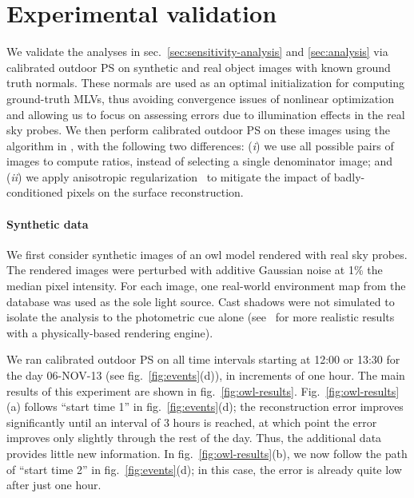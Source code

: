 \section{Experimental validation}

We validate the analyses in sec.~\ref{sec:sensitivity-analysis} and \ref{sec:analysis} via calibrated outdoor PS on synthetic and real object images with known ground truth normals. These normals are used as an optimal initialization for computing ground-truth MLVs, thus avoiding convergence issues of nonlinear optimization and allowing us to focus on assessing errors due to illumination effects in the real sky probes. We then perform calibrated outdoor PS on these images using the algorithm in \cite{yu-iccp-13}, with the following two differences: (\emph{i}) we use all possible pairs of images to compute ratios, instead of selecting a single denominator image; and (\emph{ii}) we apply anisotropic regularization~\cite{hernandez-pami-11} to mitigate the impact of badly-conditioned pixels on the surface reconstruction.

%
\vspace{-3mm}
\paragraph{Synthetic data}%
%
We first consider synthetic images of an owl model rendered with real sky probes. The rendered images were perturbed with additive Gaussian noise at 1\% the median pixel intensity. For each image, one real-world environment map from the database was used as the sole light source. Cast shadows were not simulated to isolate the analysis to the photometric cue alone (see~\cite{webpageXhourPS} for more realistic results with a physically-based rendering engine). 


We ran calibrated outdoor PS on all time intervals starting at 12:00 or 13:30 for the day 06-NOV-13 (see fig.~\ref{fig:events}(d)), in increments of one hour. The main results of this experiment are shown in fig.~\ref{fig:owl-results}. Fig.~\ref{fig:owl-results}(a) follows ``start time 1'' in fig.~\ref{fig:events}(d); the reconstruction error improves significantly until an interval of 3 hours is reached, at which point the error improves only slightly through the rest of the day. Thus, the additional data provides little new information. In fig.~\ref{fig:owl-results}(b), we now follow the path of ``start time 2'' in fig.~\ref{fig:events}(d); in this case, the error is already quite low after just one hour.
%
\vspace{-3mm}
